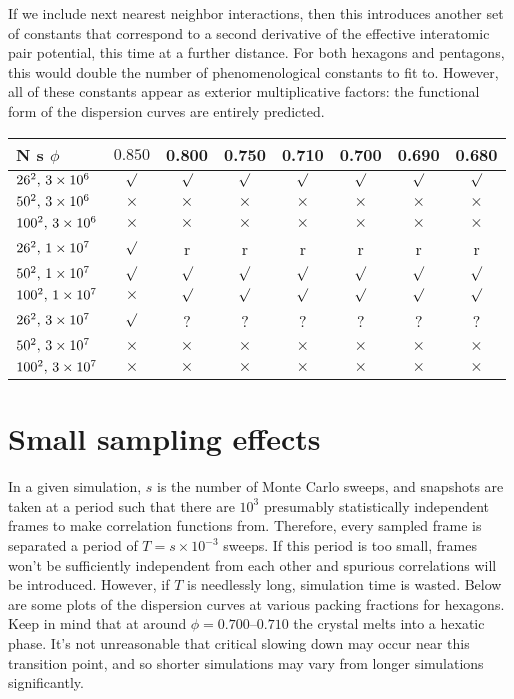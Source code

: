 \documentclass[12pt]{article}
\begin{document}
If we include next nearest neighbor interactions, then this introduces another set of constants that correspond to a second derivative of the effective interatomic pair potential, this time at a further distance. For both hexagons and pentagons, this would double the number of phenomenological constants to fit to. However, all of these constants appear as exterior multiplicative factors: the functional form of the dispersion curves are entirely predicted.

\begin{center}
\begin{tabular}{|| l ||c|c|c|c|c|c|c||} \hline \hline
N \quad s \quad $\phi$ & $0.850$ & 0.800 & 0.750 & 0.710 & 0.700 & 0.690 & 0.680 \\ \hline \hline
$26^2,\, 3\times10^{6}$ & $\surd$ & $\surd$ & $\surd$ & $\surd$ & $\surd$ & $\surd$ & $\surd$ \\ \hline
$50^2, \,3\times10^{6}$ & $\times$ & $\times$ & $\times$ & $\times$ & $\times$ & $\times$ & $\times$ \\ \hline
$100^2,\, 3\times10^{6}$ & $\times$ & $\times$ & $\times$ & $\times$ & $\times$ & $\times$ & $\times$ \\ \hline
$26^2,\, 1\times10^{7}$ & $\surd$ & r & r & r & r & r & r \\ \hline
$50^2, \,1\times10^{7}$ & $\surd$ & $\surd$ & $\surd$ & $\surd$ & $\surd$ & $\surd$ & $\surd$ \\ \hline
$100^2,\, 1\times10^{7}$ & $\times$ & $\surd$ & $\surd$ & $\surd$ & $\surd$ & $\surd$ & $\surd$ \\ \hline
$26^2,\, 3\times10^{7}$ & $\surd$ & ? & ? & ? & ? & ? & ? \\ \hline
$50^2, \,3\times10^{7}$ & $\times$ & $\times$ & $\times$ & $\times$ & $\times$ & $\times$ & $\times$ \\ \hline
$100^2,\, 3\times10^{7}$ & $\times$ & $\times$ & $\times$ & $\times$ & $\times$ & $\times$ & $\times$ \\ \hline \hline
\end{tabular}
\end{center}

\pagebreak
\section{Small sampling effects}
\label{sec:s}

In a given simulation, $s$ is the number of Monte Carlo sweeps, and snapshots are taken at a period such that there are $10^3$ presumably statistically independent frames to make correlation functions from. Therefore, every sampled frame is separated a period of $T = s\times 10^{-3}$ sweeps. If this period is too small, frames won't be sufficiently independent from each other and spurious correlations will be introduced. However, if $T$ is needlessly long, simulation time is wasted. Below are some plots of the dispersion curves at various packing fractions for hexagons. Keep in mind that at around $\phi = 0.700$--$0.710$ the crystal melts into a hexatic phase. It's not unreasonable that critical slowing down may occur near this transition point, and so shorter simulations may vary from longer simulations significantly.
\end{document}
